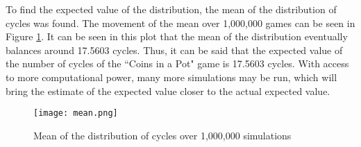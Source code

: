 To find the expected value of the distribution, the mean of the distribution of cycles was found. The movement of the mean over 1,000,000 games can be seen in Figure \ref{fig:mean}. It can be seen in this plot that the mean of the distribution eventually balances around 17.5603 cycles. Thus, it can be said that the expected value of the number of cycles of the ``Coins in a Pot" game is 17.5603 cycles. With access to more computational power, many more simulations may be run, which will bring the estimate of the expected value closer to the actual expected value.

\begin{figure}[H]
\centering
\texttt{[image: mean.png]}
\caption{Mean of the distribution of cycles over 1,000,000 simulations}
\label{fig:mean}
\end{figure}
